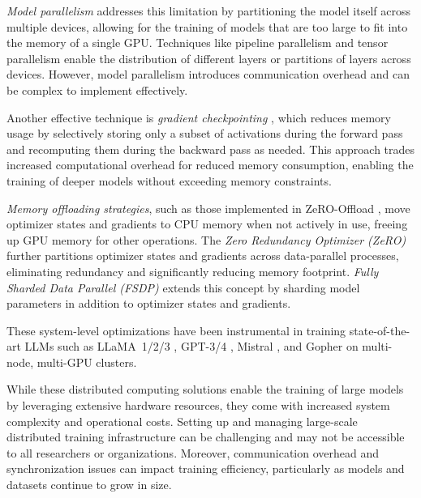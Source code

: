 \textit{Model parallelism} addresses this limitation by partitioning the model itself across multiple devices, allowing for the training of models that are too large to fit into the memory of a single GPU. Techniques like pipeline parallelism \citep{huangGPipeEfficientTraining2019} and tensor parallelism \citep{shoeybiMegatronLMTuningScaling2019} enable the distribution of different layers or partitions of layers across devices. However, model parallelism introduces communication overhead and can be complex to implement effectively.

Another effective technique is \textit{gradient checkpointing} \citep{chenTrainingDeepNets2016}, which reduces memory usage by selectively storing only a subset of activations during the forward pass and recomputing them during the backward pass as needed. This approach trades increased computational overhead for reduced memory consumption, enabling the training of deeper models without exceeding memory constraints.

\textit{Memory offloading strategies}, such as those implemented in ZeRO-Offload \citep{rajbhandariZeROMemoryOptimizations2020}, move optimizer states and gradients to CPU memory when not actively in use, freeing up GPU memory for other operations. The \textit{Zero Redundancy Optimizer (ZeRO)} \citep{rajbhandariZeROMemoryOptimizations2020} further partitions optimizer states and gradients across data-parallel processes, eliminating redundancy and significantly reducing memory footprint. \textit{Fully Sharded Data Parallel (FSDP)} \citep{zhaoExtendingTorchElasticStateful2020} extends this concept by sharding model parameters in addition to optimizer states and gradients.

 These system-level optimizations have been instrumental in training state-of-the-art LLMs such as LLaMA~1/2/3 \citep{touvronLlamaOpenFoundation2023}, GPT-3/4 \citep{brownLanguageModelsAre2020}, Mistral \citep{jiangMistralEfficientComposable2023}, and Gopher \citep{raeScalingLanguageModels2021} on multi-node, multi-GPU clusters.

While these distributed computing solutions enable the training of large models by leveraging extensive hardware resources, they come with increased system complexity and operational costs. Setting up and managing large-scale distributed training infrastructure can be challenging and may not be accessible to all researchers or organizations. Moreover, communication overhead and synchronization issues can impact training efficiency, particularly as models and datasets continue to grow in size.


